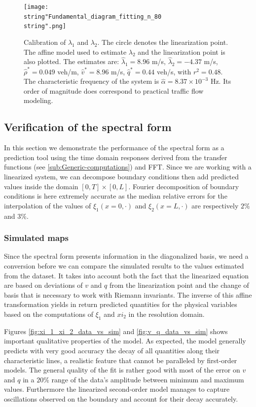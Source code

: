 \documentclass[a4paper, 10pt, conference]{ieeeconf}      %
\begin{document}
\begin{figure}[H]
\centering
\texttt{[image: \\string"Fundamental\_diagram\_fitting\_n\_80\\string".png]}
\protect\caption{Calibration of $\lambda_{1}$ and $\lambda_{2}$. The circle denotes the linearization point. The affine model used to estimate $\lambda_{2}$ and the linearization point is also plotted. The estimates are: $\widehat{\lambda}_{1}=8.96$ m/s, $\widehat{\lambda}_{2}=-4.37$ m/s, $\widehat{\rho}^{*}=0.049$ veh/m, $\widehat{v}^{*}=8.96$ m/s, $\widehat{q}^{*}=0.44$ veh/s, with $r^{2}=0.48$. The characteristic frequency of the system is $\widehat{\alpha} = 8.37\times10^{-3}$ Hz. Its order of magnitude does correspond to practical traffic flow modeling.}
\label{fig:Calibration-of-eigen-values}
\end{figure}

\subsection{Verification of the spectral form}
In this section we demonstrate the performance of the spectral form as a prediction tool using the time domain responses derived from the transfer functions (see \ref{sub:Generic-computations}) and FFT. Since we are working with a linearized system, we can decompose boundary conditions then add predicted values inside the domain $\left[0,T\right]\times\left[0,L\right]$. Fourier decomposition of boundary conditions is here extremely accurate as the median relative errors for the interpolation of the values of $\xi_{1}\left(x=0, \cdot \right)$ and $\xi_{2}\left(x=L, \cdot \right)$ are respectively $2\%$ and $3\%$.

\subsubsection{Simulated maps}
Since the spectral form presents information in the diagonalized basis, we need a conversion before we can compare the simulated results to the values estimated from the dataset. It takes into account both the fact that the linearized equation are based on deviations of $v$ and $q$ from the linearization point and the change of basis that is necessary to work with Riemann invariants. The inverse of this affine transformation yields in return predicted quantities for the physical variables based on the computations of $\xi_1$ and $xi_2$ in the resolution domain.

Figures \ref{fig:xi_1_xi_2_data_vs_sim} and \ref{fig:v_q_data_vs_sim} shows important qualitative properties of the model. As expected, the model generally predicts with very good accuracy the decay of all quantities along their characteristic lines, a realistic feature that cannot be paralleled by first-order models. The general quality of the fit is rather good with most of the error on $v$ and $q$ in a $20\%$ range of the data's amplitude between minimum and maximum values. Furthermore the linearized second-order model manages to capture oscillations observed on the boundary and account for their decay accurately.
\end{document}

